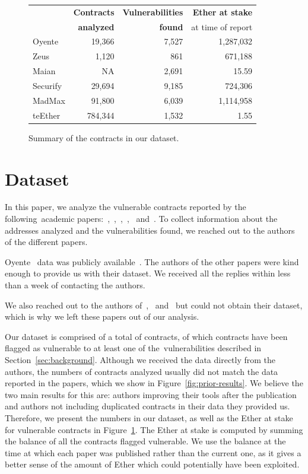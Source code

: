 \begin{figure}
  \centering
  \setlength{\tabcolsep}{5pt}
  \begin{tabular}{lrrr}
    \toprule
    \bf \multirow{2}{*}{Name} & \bf Contracts & \bf Vulnerabilities & \bf Ether at stake\\
                              & \bf analyzed & \bf found & {\small at time of report} \\
    \midrule
    Oyente & 19,366 & 7,527 & 1,287,032\\
    Zeus & 1,120 & 861 & 671,188\\
    Maian & NA & 2,691 & 15.59 \\
    Securify & 29,694 & 9,185 & 724,306\\
    MadMax & 91,800 & 6,039 & 1,114,958\\
    teEther & 784,344 & 1,532 & 1.55\\
    \bottomrule
  \end{tabular}
  \caption{Summary of the contracts in our dataset.}
  \label{fig:dataset-stats}
\end{figure}

\section{Dataset}
\label{sec:datasets}
In this paper, we analyze the vulnerable contracts reported by the following~\PapersAnalyzed academic papers:~\cite{Luu2016a},~\cite{DBLP:conf/ndss/KalraGDS18},~\cite{Nikolic2018a},~\cite{Tsankov2018},~\cite{Grech2018} and~\cite{Krupp2018}. To collect information about the addresses analyzed and the vulnerabilities found, we reached out to the authors of the different papers.

Oyente~\cite{Luu2016a} data was publicly available~\cite{oyente-benchmarks}. The authors of the other papers were kind enough to provide us with their dataset. We received all the replies within less than a week of contacting the authors.

We also reached out to the authors of~\cite{Tikhomirov2017},~\cite{Jiang2018} and~\cite{Brent2018} but could not obtain their dataset, which is why we left these papers out of our analysis.

Our dataset is comprised of a total of  contracts, of which \VulnerableContracts contracts have been flagged as vulnerable to at least one of the~\VulnTypes vulnerabilities described in Section~\ref{sec:background}. Although we received the data directly from the authors, the numbers of contracts analyzed usually did not match the data reported in the papers, which we show in Figure~\ref{fig:prior-results}. We believe the two main results for this are: authors improving their tools after the publication and authors not including duplicated contracts in their data they provided us. Therefore, we present the numbers in our dataset, as well as the Ether at stake for vulnerable contracts in Figure~\ref{fig:dataset-stats}. The Ether at stake is computed by summing the balance of all the contracts flagged vulnerable. We use the balance at the time at which each paper was published rather than the current one, as it gives a better sense of the amount of Ether which could potentially have been exploited.

